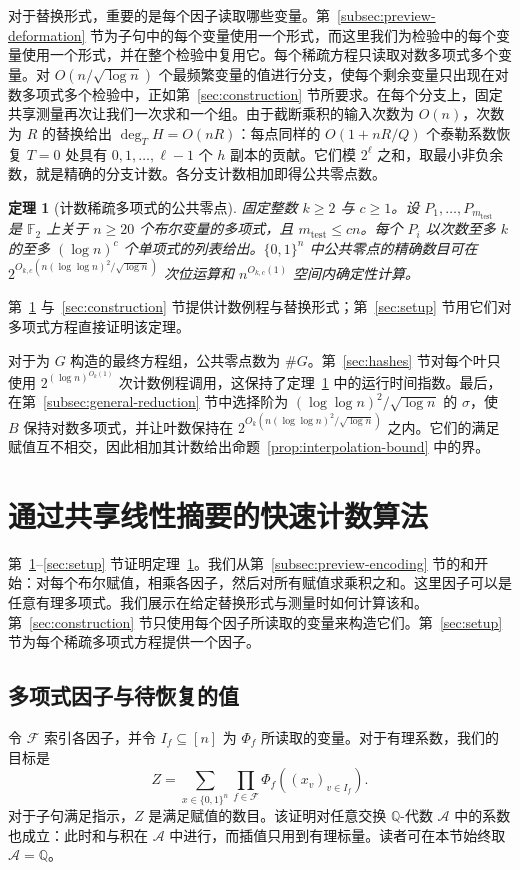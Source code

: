 \documentclass[11pt,reqno]{amsart}
\numberwithin{equation}{section}
\newtheorem{theorem}{定理}[section]
\theoremstyle{definition}\newtheorem{definition}[theorem]{定义}
\theoremstyle{remark}\newtheorem{remark}[theorem]{注}
\renewcommand{\le}{\leqslant}
\renewcommand{\ge}{\geqslant}
\begin{document}
对于替换形式，重要的是每个因子读取哪些变量。第~\ref{subsec:preview-deformation} 节为子句中的每个变量使用一个形式，而这里我们为检验中的每个变量使用一个形式，并在整个检验中复用它。每个稀疏方程只读取对数多项式多个变量。对 $O(n/\sqrt{\log n})$ 个最频繁变量的值进行分支，使每个剩余变量只出现在对数多项式多个检验中，正如第~\ref{sec:construction} 节所要求。在每个分支上，固定共享测量再次让我们一次求和一个组。由于截断乘积的输入次数为 $O(n)$，次数为 $R$ 的替换给出 $\deg_T H=O(nR)$：每点同样的 $O(1+nR/Q)$ 个泰勒系数恢复 $T=0$ 处具有 $0,1,\ldots,\ell-1$ 个 $h$ 副本的贡献。它们模 $2^\ell$ 之和，取最小非负余数，就是精确的分支计数。各分支计数相加即得公共零点数。

\begin{theorem}[计数稀疏多项式的公共零点]
\label{thm:overview-sparse-polynomials}
固定整数 $k\ge2$ 与 $c\ge1$。设 $P_1,\ldots,P_{m_{\mathrm{test}}}$ 是 $\mathbb F_2$ 上关于 $n\ge20$ 个布尔变量的多项式，且 $m_{\mathrm{test}}\le cn$。每个 $P_i$ 以次数至多 $k$ 的至多 $(\log n)^c$ 个单项式的列表给出。$\{0,1\}^n$ 中公共零点的精确数目可在 $2^{O_{k,c}(n(\log\log n)^2/\sqrt{\log n})}$ 次位运算和 $n^{O_{k,c}(1)}$ 空间内确定性计算。
\end{theorem}
第~\ref{sec:counting} 与~\ref{sec:construction} 节提供计数例程与替换形式；第~\ref{sec:setup} 节用它们对多项式方程直接证明该定理。

对于为 $G$ 构造的最终方程组，公共零点数为 $\#G$。第~\ref{sec:hashes} 节对每个叶只使用 $2^{(\log n)^{O_k(1)}}$ 次计数例程调用，这保持了定理~\ref{thm:overview-sparse-polynomials} 中的运行时间指数。最后，在第~\ref{subsec:general-reduction} 节中选择阶为 $(\log\log n)^2/\sqrt{\log n}$ 的 $\sigma$，使 $B$ 保持对数多项式，并让叶数保持在 $2^{O_k(n(\log\log n)^2/\sqrt{\log n})}$ 之内。它们的满足赋值互不相交，因此相加其计数给出命题~\ref{prop:interpolation-bound} 中的界。

\section{通过共享线性摘要的快速计数算法}\label{sec:counting}
第~\ref{sec:counting}--\ref{sec:setup} 节证明定理~\ref{thm:overview-sparse-polynomials}。我们从第~\ref{subsec:preview-encoding} 节的和开始：对每个布尔赋值，相乘各因子，然后对所有赋值求乘积之和。这里因子可以是任意有理多项式。我们展示在给定替换形式与测量时如何计算该和。第~\ref{sec:construction} 节只使用每个因子所读取的变量来构造它们。第~\ref{sec:setup} 节为每个稀疏多项式方程提供一个因子。

\subsection{多项式因子与待恢复的值}
\label{subsec:product-interface}
令 $\mathcal F$ 索引各因子，并令 $I_f\subseteq[n]$ 为 $\Phi_f$ 所读取的变量。对于有理系数，我们的目标是
\begin{equation}\label{eq:general-product-sum}
 Z=\sum_{x\in\{0,1\}^n}\prod_{f\in\mathcal F}\Phi_f((x_v)_{v\in I_f}).
\end{equation}
对于子句满足指示，$Z$ 是满足赋值的数目。该证明对任意交换 $\mathbb Q$-代数 $\mathcal A$ 中的系数也成立：此时和与积在 $\mathcal A$ 中进行，而插值只用到有理标量。读者可在本节始终取 $\mathcal A=\mathbb Q$。
\end{document}
